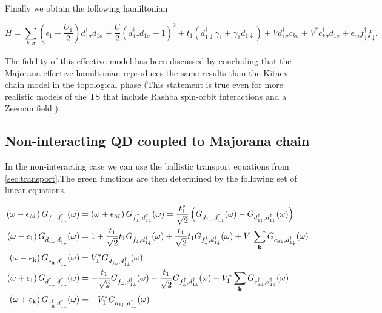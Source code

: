 Finally we obtain the following hamiltonian

\begin{equation}
H =\sum_{k,\sigma}\left(\epsilon_1+\frac{U_1}{2}\right)d_{1\sigma}^{\dagger}d_{1\sigma}+ \frac{U}{2}(d_{1\sigma}^{\dagger}d_{1\sigma}-1)^{2} + t_1 \left(d_{1\downarrow}^{\dagger}\gamma_{1}+\gamma_{1}d_{1\downarrow}\right) + Vd^\dagger_{1\sigma}c_{k\sigma}+V^* c^\dagger_{k\sigma}d_{1\sigma}+ \epsilon_{m}f_{\downarrow}^{\dagger}f_{\downarrow}.
\label{eq:QD-Mham}
\end{equation}


The fidelity of this effective model has been discussed by \citet{ruiz-tijerina_interaction_2015}
concluding that the Majorana effective hamiltonian reproduces the
same results than the Kitaev chain model in the topological phase
(This statement is true even for more realistic models of the TS that
include Rashba spin-orbit interactions and a Zeeman field \citep{ruiz-tijerina_interaction_2015}
).\\


\subsection{Non-interacting QD coupled to  Majorana chain \label{sec:GreenMaj-DQD}}

In the non-interacting case we can use the ballistic transport equations from \ref{sec:transport}.The green functions are then determined by the following set of linear equations. 




\begin{align}
    \left(\omega-\epsilon_{M}\right)G_{f_{\downarrow},d_{1\downarrow}^{\dagger}}(\omega)&=\left(\omega+\epsilon_{M}\right)G_{f_{\downarrow}^{\dagger},d_{1\downarrow}^{\dagger}}(\omega)=\frac{t^*_1}{\sqrt{2}}\left(G_{d_{1\downarrow},d_{1\downarrow}^{\dagger}}(\omega)-G_{d_{1\downarrow}^{\dagger},d_{1\downarrow}^{\dagger}}(\omega)\right) \label{eq:QDM1} \\ 
    \left(\omega-\epsilon_{1}\right)G_{d_{1\downarrow},d_{1\downarrow}^{\dagger}}(\omega)&=1+\frac{t_1}{\sqrt{2}}t_{1}G_{f_{\downarrow},d_{1\downarrow}^{\dagger}}(\omega)+\frac{t_1}{\sqrt{2}}t_{1}G_{f_{\downarrow}^{\dagger},d_{1\downarrow}^{\dagger}}(\omega)+V_{1}\sum_{\mathbf{k}}G_{c_{\mathbf{k\downarrow}},d_{1\downarrow}^{\dagger}}(\omega) \label{eq:QDM2} \\ 
    \left(\omega-\epsilon_{\mathbf{k}}\right)G_{c_{\mathbf{k}},d_{1\downarrow}^{\dagger}}(\omega)&=V_{1}^{*}G_{d_{1\downarrow},d_{1\downarrow}^{\dagger}}(\omega)\label{eq:QDM3} \\
    \left(\omega+\epsilon_{1}\right)G_{d_{1\downarrow}^{\dagger},d_{1\downarrow}^{\dagger}}(\omega)&=-\frac{t_1}{\sqrt{2}}G_{f_{\downarrow},d_{1\downarrow}^{\dagger}}(\omega)-\frac{t_1}{\sqrt{2}}G_{f_{\downarrow}^{\dagger},d_{1\downarrow}^{\dagger}}(\omega)-V_{1}^{*}\sum_{\mathbf{k}}G_{c_{\mathbf{k\downarrow}}^{\dagger},d_{1\downarrow}^{\dagger}}(\omega) \label{eq:QDM4} \\
    \left(\omega+\epsilon_{\mathbf{k}}\right)G_{c^\dagger_{\mathbf{k}},d_{1\downarrow}^{\dagger}}(\omega)&=-V_{1}^{*}G_{d_{1\downarrow},d_{1\downarrow}^{\dagger}}(\omega) \label{eq:QDM5}
\end{align}

